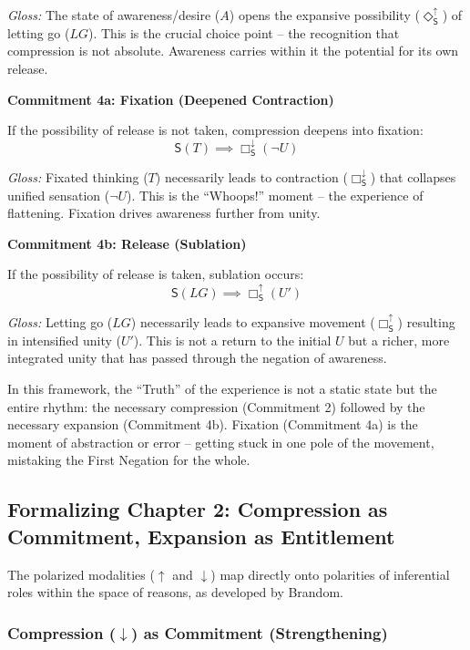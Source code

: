 \documentclass[12pt]{book}
\newcommand{\SBoxUp}{\Box_{\mathsf{S}}^{\uparrow}}
\newcommand{\SBoxDown}{\Box_{\mathsf{S}}^{\downarrow}}
\newcommand{\SDiaUp}{\Diamond_{\mathsf{S}}^{\uparrow}}
\begin{document}
\textit{Gloss:} The state of awareness/desire ($A$) opens the expansive possibility ($\SDiaUp$) of letting go ($LG$). This is the crucial choice point -- the recognition that compression is not absolute. Awareness carries within it the potential for its own release.

\bigskip

\noindent\textbf{Commitment 4a: Fixation (Deepened Contraction)}

If the possibility of release is not taken, compression deepens into fixation:
$$ \mathsf{S}(T) \implies \SBoxDown(\neg U) $$

\textit{Gloss:} Fixated thinking ($T$) necessarily leads to contraction ($\SBoxDown$) that collapses unified sensation ($\neg U$). This is the ``Whoops!'' moment -- the experience of flattening. Fixation drives awareness further from unity.

\bigskip

\noindent\textbf{Commitment 4b: Release (Sublation)}

If the possibility of release is taken, sublation occurs:
$$ \mathsf{S}(LG) \implies \SBoxUp(U') $$

\textit{Gloss:} Letting go ($LG$) necessarily leads to expansive movement ($\SBoxUp$) resulting in intensified unity ($U'$). This is not a return to the initial $U$ but a richer, more integrated unity that has passed through the negation of awareness.

\bigskip

In this framework, the ``Truth'' of the experience is not a static state but the entire rhythm: the necessary compression (Commitment 2) followed by the necessary expansion (Commitment 4b). Fixation (Commitment 4a) is the moment of abstraction or error -- getting stuck in one pole of the movement, mistaking the First Negation for the whole.

\subsection{Formalizing Chapter 2: Compression as Commitment, Expansion as Entitlement}

The polarized modalities ($\uparrow$ and $\downarrow$) map directly onto polarities of inferential roles within the space of reasons, as developed by Brandom.

\subsubsection{Compression ($\downarrow$) as Commitment (Strengthening)}
\end{document}
